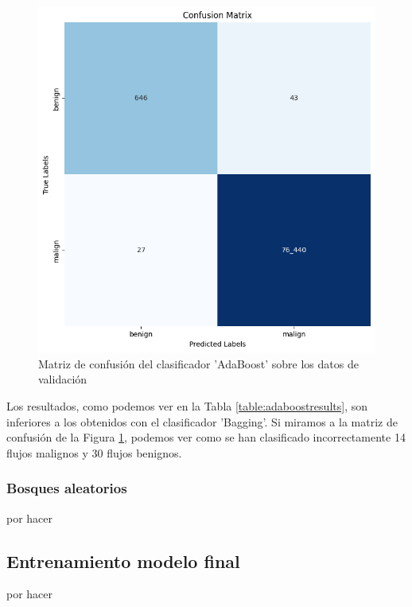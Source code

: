 \begin{figure}[H]
    \begin{center}
        \includegraphics[width=0.55\linewidth]{media/packet_pincer_train_models_adaboost.png}
    \end{center}
    \caption{Matriz de confusión del clasificador 'AdaBoost' sobre los datos de validación}\label{fig:adaboostmatrix}
\end{figure}

Los resultados, como podemos ver en la Tabla \ref{table:adaboostresults}, son inferiores a los obtenidos con el clasificador 'Bagging'. Si miramos a la matriz de confusión de la Figura \ref{fig:adaboostmatrix}, podemos ver como se han clasificado incorrectamente 14 flujos malignos y 30 flujos benignos.

\subsubsection{Bosques aleatorios} %

por hacer

\subsection{Entrenamiento modelo final}

por hacer
